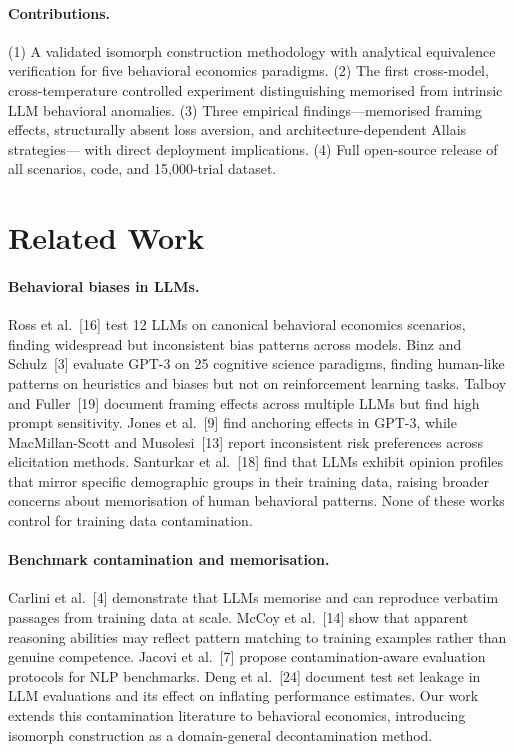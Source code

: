 \documentclass{article}
\begin{document}
\paragraph{Contributions.}
(1) A validated isomorph construction methodology with analytical equivalence
verification for five behavioral economics paradigms.
(2) The first cross-model, cross-temperature controlled experiment
distinguishing memorised from intrinsic LLM behavioral anomalies.
(3) Three empirical findings---memorised framing effects, structurally
absent loss aversion, and architecture-dependent Allais strategies---
with direct deployment implications.
(4) Full open-source release of all scenarios, code, and 15,000-trial dataset.

\section{Related Work}

\paragraph{Behavioral biases in LLMs.}
Ross et al.~[16] test 12 LLMs on canonical behavioral economics scenarios,
finding widespread but inconsistent bias patterns across models. Binz and
Schulz~[3] evaluate GPT-3 on 25 cognitive science paradigms, finding
human-like patterns on heuristics and biases but not on reinforcement
learning tasks. Talboy and Fuller~[19] document framing effects across
multiple LLMs but find high prompt sensitivity. Jones et al.~[9] find
anchoring effects in GPT-3, while MacMillan-Scott and Musolesi~[13] report
inconsistent risk preferences across elicitation methods. Santurkar et
al.~[18] find that LLMs exhibit opinion profiles that mirror specific
demographic groups in their training data, raising broader concerns about
memorisation of human behavioral patterns. None of these works control for
training data contamination.

\paragraph{Benchmark contamination and memorisation.}
Carlini et al.~[4] demonstrate that LLMs memorise and can reproduce verbatim
passages from training data at scale. McCoy et al.~[14] show that apparent
reasoning abilities may reflect pattern matching to training examples rather
than genuine competence. Jacovi et al.~[7] propose contamination-aware
evaluation protocols for NLP benchmarks. Deng et al.~[24] document test set
leakage in LLM evaluations and its effect on inflating performance estimates.
Our work extends this contamination literature to behavioral economics,
introducing isomorph construction as a domain-general decontamination method.
\end{document}
